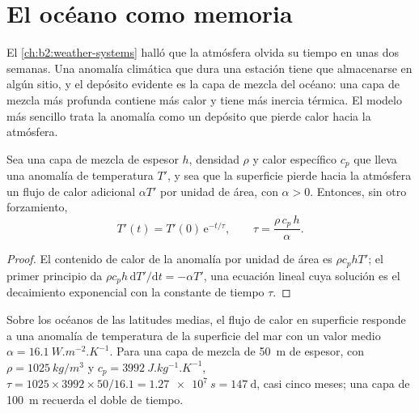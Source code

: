 \section{El océano como memoria}\label{sec:b2:climate-variability:memory}

El \cref{ch:b2:weather-systems} halló que la atmósfera olvida su tiempo en unas dos semanas.
Una anomalía climática que dura una estación tiene que almacenarse en algún sitio, y el depósito evidente es la capa
de mezcla del océano: una capa de mezcla más profunda contiene más calor y tiene más inercia térmica. El modelo más sencillo trata la
anomalía como un depósito que pierde calor hacia la atmósfera.

\begin{proposition}\label{prop:b2:climate-variability:damping}
Sea una capa de mezcla de espesor $h$, densidad $\rho$ y calor específico $c_p$ que lleva una anomalía de temperatura
$T'$, y sea que la superficie pierde hacia la atmósfera un flujo de calor adicional $\alpha T'$ por unidad de área,
con $\alpha > 0$. Entonces, sin otro forzamiento,
\[
  T'(t) = T'(0)\,\mathrm{e}^{-t/\tau}, \qquad \tau = \frac{\rho\,c_p\,h}{\alpha} .
\]
\end{proposition}

\begin{proof}
El contenido de calor de la anomalía por unidad de área es $\rho c_p h T'$; el primer principio da $\rho c_p h
\,\mathrm{d}T'/\mathrm{d}t = -\alpha T'$, una ecuación lineal cuya solución es el decaimiento exponencial
con la constante de tiempo $\tau$.
\end{proof}

\begin{example}\label{ex:b2:climate-variability:tau}
Sobre los océanos de las latitudes medias, el flujo de calor en superficie responde a una anomalía de temperatura de la
superficie del mar con un valor medio $\alpha = \qty{16.1}{W.m^{-2}.K^{-1}}$. Para una capa de mezcla
de \qty{50}{m} de espesor, con $\rho = \qty{1025}{kg/m^3}$ y $c_p = \qty{3992}{J.kg^{-1}.K^{-1}}$,
$\tau = 1025 \times 3992 \times 50/16.1 = \qty{1.27e7}{s} = \qty{147}{\day}$, casi cinco
meses; una capa de \qty{100}{m} recuerda el doble de tiempo.
\end{example}

